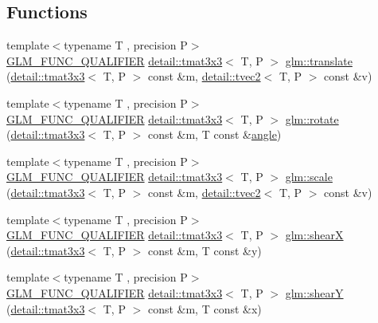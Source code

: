 \subsection*{Functions}
\begin{DoxyCompactItemize}
\item 
{\footnotesize template$<$typename T , precision P$>$ }\\\hyperlink{setup_8hpp_a33fdea6f91c5f834105f7415e2a64407}{G\+L\+M\+\_\+\+F\+U\+N\+C\+\_\+\+Q\+U\+A\+L\+I\+F\+I\+ER} \hyperlink{structglm_1_1detail_1_1tmat3x3}{detail\+::tmat3x3}$<$ T, P $>$ \hyperlink{group__gtx__matrix__transform__2d_gaa73c0e940e66b4e8aebf9dc72f5a7e34}{glm\+::translate} (\hyperlink{structglm_1_1detail_1_1tmat3x3}{detail\+::tmat3x3}$<$ T, P $>$ const \&m, \hyperlink{structglm_1_1detail_1_1tvec2}{detail\+::tvec2}$<$ T, P $>$ const \&v)
\item 
{\footnotesize template$<$typename T , precision P$>$ }\\\hyperlink{setup_8hpp_a33fdea6f91c5f834105f7415e2a64407}{G\+L\+M\+\_\+\+F\+U\+N\+C\+\_\+\+Q\+U\+A\+L\+I\+F\+I\+ER} \hyperlink{structglm_1_1detail_1_1tmat3x3}{detail\+::tmat3x3}$<$ T, P $>$ \hyperlink{group__gtx__matrix__transform__2d_gae172cd1e33a5c7b82c69a9731eac6c67}{glm\+::rotate} (\hyperlink{structglm_1_1detail_1_1tmat3x3}{detail\+::tmat3x3}$<$ T, P $>$ const \&m, T const \&\hyperlink{group__gtc__quaternion_ga23a3fc7ada5bbb665ff84c92c6e0542c}{angle})
\item 
{\footnotesize template$<$typename T , precision P$>$ }\\\hyperlink{setup_8hpp_a33fdea6f91c5f834105f7415e2a64407}{G\+L\+M\+\_\+\+F\+U\+N\+C\+\_\+\+Q\+U\+A\+L\+I\+F\+I\+ER} \hyperlink{structglm_1_1detail_1_1tmat3x3}{detail\+::tmat3x3}$<$ T, P $>$ \hyperlink{group__gtx__matrix__transform__2d_gaf17588e16120250980b221c2ebdde0eb}{glm\+::scale} (\hyperlink{structglm_1_1detail_1_1tmat3x3}{detail\+::tmat3x3}$<$ T, P $>$ const \&m, \hyperlink{structglm_1_1detail_1_1tvec2}{detail\+::tvec2}$<$ T, P $>$ const \&v)
\item 
{\footnotesize template$<$typename T , precision P$>$ }\\\hyperlink{setup_8hpp_a33fdea6f91c5f834105f7415e2a64407}{G\+L\+M\+\_\+\+F\+U\+N\+C\+\_\+\+Q\+U\+A\+L\+I\+F\+I\+ER} \hyperlink{structglm_1_1detail_1_1tmat3x3}{detail\+::tmat3x3}$<$ T, P $>$ \hyperlink{group__gtx__matrix__transform__2d_gaeac73f42bba3e35100d9a43c40dc0f23}{glm\+::shearX} (\hyperlink{structglm_1_1detail_1_1tmat3x3}{detail\+::tmat3x3}$<$ T, P $>$ const \&m, T const \&y)
\item 
{\footnotesize template$<$typename T , precision P$>$ }\\\hyperlink{setup_8hpp_a33fdea6f91c5f834105f7415e2a64407}{G\+L\+M\+\_\+\+F\+U\+N\+C\+\_\+\+Q\+U\+A\+L\+I\+F\+I\+ER} \hyperlink{structglm_1_1detail_1_1tmat3x3}{detail\+::tmat3x3}$<$ T, P $>$ \hyperlink{group__gtx__matrix__transform__2d_ga04dd04815c1c8ee0bd49e6ae499d8252}{glm\+::shearY} (\hyperlink{structglm_1_1detail_1_1tmat3x3}{detail\+::tmat3x3}$<$ T, P $>$ const \&m, T const \&x)
\end{DoxyCompactItemize}


